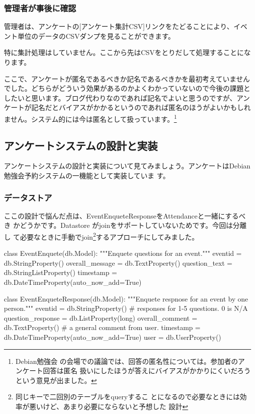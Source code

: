 \documentclass[mingoth,a4paper]{jsarticle}
\begin{document}
\subsubsection{管理者が事後に確認}

管理者は、アンケートの[アンケート集計CSV]リンクをたどることにより、イベ
ント単位のデータのCSVダンプを見ることができます。

特に集計処理はしていません。ここから先はCSVをとりだして処理することにな
ります。

ここで、アンケートが匿名であるべきか記名であるべきかを最初考えていません
でした。どちらがどういう効果があるのかよくわかっていないので今後の課題と
したいと思います。ブログ代わりなのであれば記名でよいと思うのですが、アン
ケートが記名だとバイアスがかかるというのであれば匿名のほうがよいかもしれ
ません。システム的には今は匿名として扱っています。\footnote{Debian勉強会
の会場での議論では、回答の匿名性については。参加者のアンケート回答は匿名
扱いにしたほうが答えにバイアスがかかりにくいだろうという意見が出ました。}

\subsection{アンケートシステムの設計と実装}

アンケートシステムの設計と実装について見てみましょう。アンケートはDebian
勉強会予約システム\cite{deb201002debianreserve}の一機能として実装していま
す。

\subsubsection{データストア}

ここの設計で悩んだ点は、EventEnqueteResponseをAttendanceと一緒にするべき
かどうかです。Datastore がjoinをサポートしていないためです。今回は分離し
て必要なときに手動でjoin\footnote{同じキーで二回別のテーブルをqueryするこ
とになるので必要なときには効率が悪いけど、あまり必要にならないと予想した
設計}するアプローチにしてみました。

\begin{commandline}
class EventEnquete(db.Model):
    """Enquete questions for an event."""
    eventid = db.StringProperty()
    overall_message = db.TextProperty()
    question_text = db.StringListProperty()
    timestamp = db.DateTimeProperty(auto_now_add=True)

class EventEnqueteResponse(db.Model):
    """Enquete respnose for an event by one person."""
    eventid = db.StringProperty()
    # responses for 1-5 questions. 0 is N/A
    question_response = db.ListProperty(long)
    overall_comment = db.TextProperty() # a general comment from user.
    timestamp = db.DateTimeProperty(auto_now_add=True)
    user = db.UserProperty()
\end{commandline}
\end{document}
